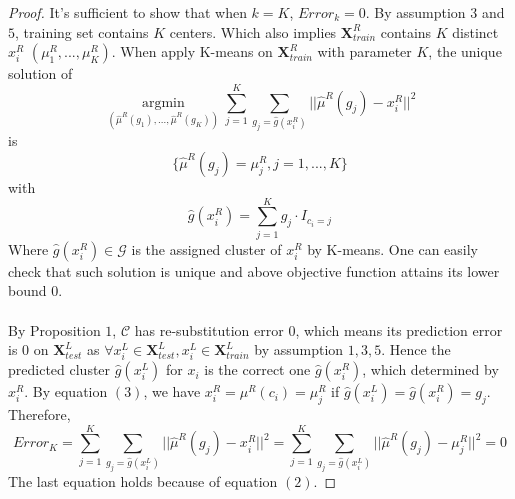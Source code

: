 \documentclass[11pt]{article}
\begin{document}
\begin{proof}
	It's sufficient to show that when $k=K$, $Error_k=0$. By assumption $3$ and $5$, training set contains $K$ centers. Which also implies $\mathbf{X}^R_{train}$ contains $K$ distinct $x^R_i$ $(\mu^R_1,...,\mu^R_K)$. When apply K-means on $\mathbf{X}^R_{train}$ with parameter $K$, the unique solution of 
	\[ \underset{\left(\hat{\mu}^R\left(g_1\right),...,\hat{\mu}^R\left(g_K\right)\right)}{\operatorname{argmin}} \sum^K_{j=1} \sum_{g_j = \hat{g} \left(x^R_i\right)} ||\hat{\mu}^R \left(g_j\right) - x^R_i||^2 \]
	is 
\begin{equation}	
	\{\hat{\mu}^R \left(g_j\right) = \mu^R_j, j=1,...,K\}
\end{equation}	
with 
\begin{equation}	 
	\hat{g} \left(x^R_i\right) = \sum^K_{j=1} g_j \cdot I_{c_i = j}
\end{equation}	
Where $\hat{g} \left(x^R_i\right) \in  \mathcal{G}$ is the assigned cluster of $x^R_i$ by K-means. One can easily check that such solution is unique and above objective function attains its lower bound $0$.\\\\
By Proposition $1$, $\mathcal{C}$ has re-substitution error $0$, which means its prediction error is $0$ on $\mathbf{X}^L_{test}$ as $\forall x^L_i \in \mathbf{X}^L_{test}, x^L_i \in \mathbf{X}^L_{train}$ by assumption $1,3,5$. Hence the predicted cluster $\hat{g} \left(x^L_i\right)$ for $x_i$ is the correct one $\hat{g} \left(x^R_i\right)$, which determined by $x^R_i$. By equation $(3)$, we have $x^R_i = \mu^R \left(c_i\right) = \mu^R_j$ if $\hat{g} \left(x^L_i\right) = \hat{g} \left(x^R_i\right) = g_j$. Therefore,
\[ Error_K = \sum^K_{j=1} \sum_{g_j = \hat{g} \left(x^L_i\right)} ||\hat{\mu}^R \left(g_j\right) - x^R_i||^2 =  \sum^K_{j=1} \sum_{g_j = \hat{g} \left(x^L_i\right)} ||\hat{\mu}^R \left(g_j\right) - \mu^R_j||^2= 0\]
The last equation holds because of equation $(2)$.
\end{proof}
\end{document}
